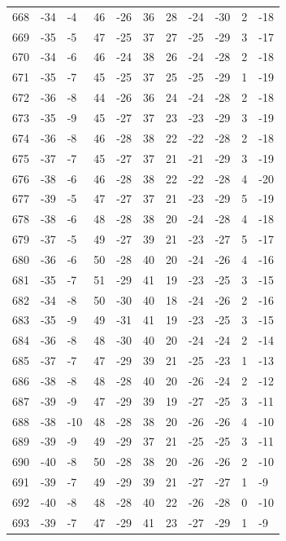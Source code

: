 \begin{table}[H]
\begin{tabular}{lllllllllll}
668 & -34 & -4 & 46 & -26 & 36 & 28 & -24 & -30 & 2 & -18 \\
669 & -35 & -5 & 47 & -25 & 37 & 27 & -25 & -29 & 3 & -17 \\
670 & -34 & -6 & 46 & -24 & 38 & 26 & -24 & -28 & 2 & -18 \\
671 & -35 & -7 & 45 & -25 & 37 & 25 & -25 & -29 & 1 & -19 \\
672 & -36 & -8 & 44 & -26 & 36 & 24 & -24 & -28 & 2 & -18 \\
673 & -35 & -9 & 45 & -27 & 37 & 23 & -23 & -29 & 3 & -19 \\
674 & -36 & -8 & 46 & -28 & 38 & 22 & -22 & -28 & 2 & -18 \\
675 & -37 & -7 & 45 & -27 & 37 & 21 & -21 & -29 & 3 & -19 \\
676 & -38 & -6 & 46 & -28 & 38 & 22 & -22 & -28 & 4 & -20 \\
677 & -39 & -5 & 47 & -27 & 37 & 21 & -23 & -29 & 5 & -19 \\
678 & -38 & -6 & 48 & -28 & 38 & 20 & -24 & -28 & 4 & -18 \\
679 & -37 & -5 & 49 & -27 & 39 & 21 & -23 & -27 & 5 & -17 \\
680 & -36 & -6 & 50 & -28 & 40 & 20 & -24 & -26 & 4 & -16 \\
681 & -35 & -7 & 51 & -29 & 41 & 19 & -23 & -25 & 3 & -15 \\
682 & -34 & -8 & 50 & -30 & 40 & 18 & -24 & -26 & 2 & -16 \\
683 & -35 & -9 & 49 & -31 & 41 & 19 & -23 & -25 & 3 & -15 \\
684 & -36 & -8 & 48 & -30 & 40 & 20 & -24 & -24 & 2 & -14 \\
685 & -37 & -7 & 47 & -29 & 39 & 21 & -25 & -23 & 1 & -13 \\
686 & -38 & -8 & 48 & -28 & 40 & 20 & -26 & -24 & 2 & -12 \\
687 & -39 & -9 & 47 & -29 & 39 & 19 & -27 & -25 & 3 & -11 \\
688 & -38 & -10 & 48 & -28 & 38 & 20 & -26 & -26 & 4 & -10 \\
689 & -39 & -9 & 49 & -29 & 37 & 21 & -25 & -25 & 3 & -11 \\
690 & -40 & -8 & 50 & -28 & 38 & 20 & -26 & -26 & 2 & -10 \\
691 & -39 & -7 & 49 & -29 & 39 & 21 & -27 & -27 & 1 & -9 \\
692 & -40 & -8 & 48 & -28 & 40 & 22 & -26 & -28 & 0 & -10 \\
693 & -39 & -7 & 47 & -29 & 41 & 23 & -27 & -29 & 1 & -9 \\

\end{tabular}
\end{table}
